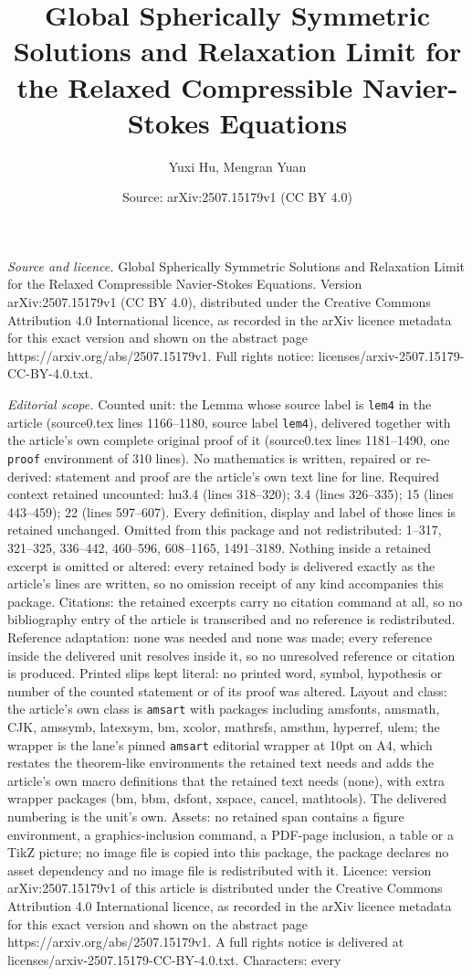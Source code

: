 \documentclass[10pt,a4paper]{amsart}
\title[Global Spherically Symmetric Solutions and Relaxation Limit ]{Global Spherically Symmetric Solutions and Relaxation Limit for the Relaxed Compressible Navier-Stokes Equations}
\author{Yuxi Hu, Mengran Yuan}
\date{Source: arXiv:2507.15179v1 (CC BY 4.0)}
\begin{document}
\maketitle

\noindent\emph{Source and licence.} Global Spherically Symmetric Solutions and Relaxation Limit for the Relaxed Compressible Navier-Stokes Equations. Version arXiv:2507.15179v1 (CC BY 4.0), distributed under the Creative Commons Attribution 4.0 International licence, as recorded in the arXiv licence metadata for this exact version and shown on the abstract page https://arxiv.org/abs/2507.15179v1. Full rights notice: licenses/arxiv-2507.15179-CC-BY-4.0.txt.\par\smallskip

\noindent\textit{Editorial scope.} Counted unit: the Lemma whose source label is \texttt{lem4} in the article (source0.tex lines 1166--1180, source label \texttt{lem4}), delivered together with the article's own complete original proof of it (source0.tex lines 1181--1490, one \texttt{proof} environment of 310 lines). No mathematics is written, repaired or re-derived: statement and proof are the article's own text line for line. Required context retained uncounted: hu3.4 (lines 318--320); 3.4 (lines 326--335); 15 (lines 443--459); 22 (lines 597--607). Every definition, display and label of those lines is retained unchanged. Omitted from this package and not redistributed: 1--317, 321--325, 336--442, 460--596, 608--1165, 1491--3189. Nothing inside a retained excerpt is omitted or altered: every retained body is delivered exactly as the article's lines are written, so no omission receipt of any kind accompanies this package. Citations: the retained excerpts carry no citation command at all, so no bibliography entry of the article is transcribed and no reference is redistributed. Reference adaptation: none was needed and none was made; every reference inside the delivered unit resolves inside it, so no unresolved reference or citation is produced. Printed slips kept literal: no printed word, symbol, hypothesis or number of the counted statement or of its proof was altered. Layout and class: the article's own class is \texttt{amsart} with packages including amsfonts, amsmath, CJK, amssymb, latexsym, bm, xcolor, mathrsfs, amsthm, hyperref, ulem; the wrapper is the lane's pinned \texttt{amsart} editorial wrapper at 10pt on A4, which restates the theorem-like environments the retained text needs and adds the article's own macro definitions that the retained text needs (none), with extra wrapper packages (bm, bbm, dsfont, xspace, cancel, mathtools). The delivered numbering is the unit's own. Assets: no retained span contains a figure environment, a graphics-inclusion command, a PDF-page inclusion, a table or a TikZ picture; no image file is copied into this package, the package declares no asset dependency and no image file is redistributed with it. Licence: version arXiv:2507.15179v1 of this article is distributed under the Creative Commons Attribution 4.0 International licence, as recorded in the arXiv licence metadata for this exact version and shown on the abstract page https://arxiv.org/abs/2507.15179v1. A full rights notice is delivered at licenses/arxiv-2507.15179-CC-BY-4.0.txt. Characters: every 
\end{document}
